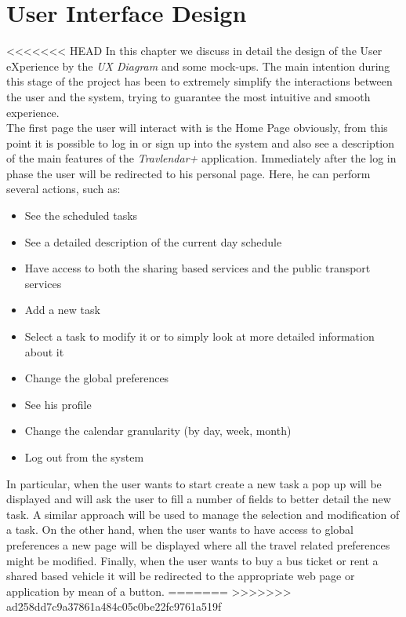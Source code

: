 \chapter{User Interface Design}
<<<<<<< HEAD
In this chapter we discuss in detail the design of the User eXperience by the \emph{UX Diagram} and some mock-ups. The main intention during this stage of the project has been to extremely simplify the interactions between the user and the system, trying to guarantee the most intuitive and smooth experience. 
\\The first page the user will interact with is the Home Page obviously, from this point it is possible to log in or sign up into the system and also see a description of the main features of the \emph{Travlendar+} application.
Immediately after the log in phase the user will be redirected to his personal page. Here, he can perform several actions, such as: 
\begin{itemize}
    \item See the scheduled tasks
    \item See a detailed description of the current day schedule
    \item Have access to both the sharing based services and the public transport services 
    \item Add a new task
    \item Select a task to modify it or to simply look at more detailed information about it
    \item Change the global preferences
    \item See his profile
    \item Change the calendar granularity (by day, week, month)
    \item Log out from the system 
\end{itemize}  
In particular, when the user wants to start create a new task a pop up will be displayed and will ask the user to fill a number of fields to better detail the new task. A similar approach will be used to manage the selection and modification of a task.
On the other hand, when the user wants to have access to global preferences a new page will be displayed where all the travel related preferences might be modified. 
Finally, when the user wants to buy a bus ticket or rent a shared based vehicle it will be redirected to the appropriate web page or application by mean of a button. 
=======
>>>>>>> ad258dd7c9a37861a484c05c0be22fc9761a519f

